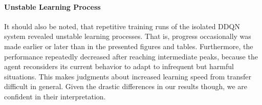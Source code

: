 \paragraph{Unstable Learning Process} It should also be noted, that repetitive training runs of the isolated DDQN system revealed unstable learning processes. That is, progress occasionally was made earlier or later than in the presented figures and tables. Furthermore, the performance repeatedly decreased after reaching intermediate peaks, because the agent reconsiders its current behavior to adapt to infrequent but harmful situations. This makes judgments about increased learning speed from transfer difficult in general. Given the drastic differences in our results though, we are confident in their interpretation.  